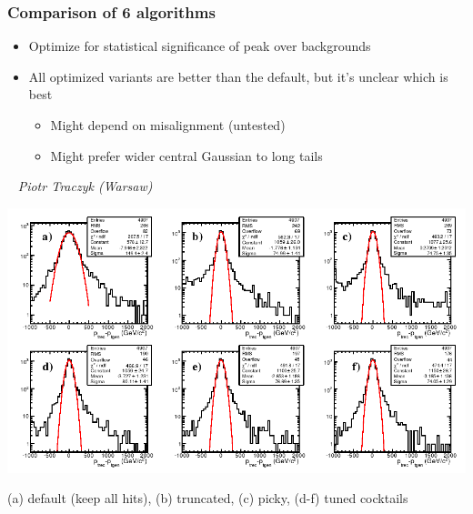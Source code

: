 \documentclass[compress]{beamer}
\begin{document}
\begin{frame}
\frametitle{Comparison of 6 algorithms}

\vfill
\begin{itemize}
\item Optimize for statistical significance of peak over backgrounds
\item All optimized variants are better than the default, but it's unclear which is best
\begin{itemize}
\item Might depend on misalignment (untested)
\item Might prefer wider central Gaussian to long tails
\end{itemize}
\end{itemize}

\scriptsize \mbox{ } \hfill \it Piotr Traczyk (Warsaw) 

\vspace{-0.38 cm}
\begin{center}
\includegraphics[width=0.8\linewidth]{compare_reconstructors.png}

\scriptsize (a) default (keep all hits), (b) truncated, (c) picky, (d-f) tuned cocktails
\end{center}
\end{frame}
\end{document}
